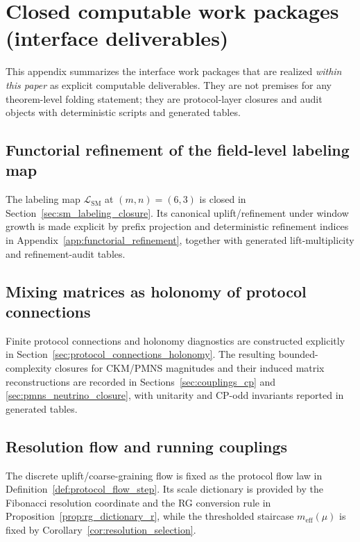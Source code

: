 \section{Closed computable work packages (interface deliverables)}
\label{app:next_steps}

This appendix summarizes the interface work packages that are realized \emph{within this paper} as explicit computable deliverables.
They are not premises for any theorem-level folding statement; they are protocol-layer closures and audit objects with deterministic scripts and generated tables.

\subsection{Functorial refinement of the field-level labeling map}
The labeling map $\mathcal{L}_{\mathrm{SM}}$ at $(m,n)=(6,3)$ is closed in Section~\ref{sec:sm_labeling_closure}.
Its canonical uplift/refinement under window growth is made explicit by prefix projection and deterministic refinement indices in Appendix~\ref{app:functorial_refinement}, together with generated lift-multiplicity and refinement-audit tables.

\subsection{Mixing matrices as holonomy of protocol connections}
Finite protocol connections and holonomy diagnostics are constructed explicitly in Section~\ref{sec:protocol_connections_holonomy}.
The resulting bounded-complexity closures for CKM/PMNS magnitudes and their induced matrix reconstructions are recorded in Sections~\ref{sec:couplings_cp} and \ref{sec:pmns_neutrino_closure}, with unitarity and CP-odd invariants reported in generated tables.

\subsection{Resolution flow and running couplings}
The discrete uplift/coarse-graining flow is fixed as the protocol flow law in Definition~\ref{def:protocol_flow_step}.
Its scale dictionary is provided by the Fibonacci resolution coordinate and the RG conversion rule in Proposition~\ref{prop:rg_dictionary_r}, while the thresholded staircase $m_{\mathrm{eff}}(\mu)$ is fixed by Corollary~\ref{cor:resolution_selection}.

